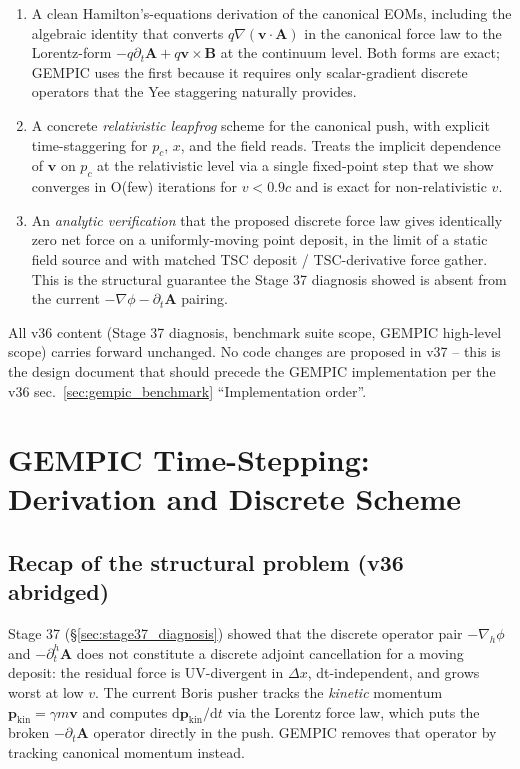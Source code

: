 \documentclass[11pt,a4paper]{article}
\newcommand{\vv}[1]{\mathbf{#1}}
\newcommand{\dd}{\mathrm{d}}
\begin{document}
\begin{enumerate}
  \item A clean Hamilton's-equations derivation of the canonical
    EOMs, including the algebraic identity that converts
    $q\nabla(\vv{v}\cdot\vv{A})$ in the canonical force law to the
    Lorentz-form $-q\partial_t\vv{A} + q\vv{v}\times\vv{B}$ at the
    continuum level.  Both forms are exact; GEMPIC uses the first
    because it requires only scalar-gradient discrete operators
    that the Yee staggering naturally provides.
  \item A concrete \emph{relativistic leapfrog} scheme for the
    canonical push, with explicit time-staggering for $p_c$, $x$,
    and the field reads.  Treats the implicit dependence of
    $\vv{v}$ on $p_c$ at the relativistic level via a single
    fixed-point step that we show converges in O(few) iterations
    for $v < 0.9c$ and is exact for non-relativistic $v$.
  \item An \emph{analytic verification} that the proposed discrete
    force law gives identically zero net force on a uniformly-moving
    point deposit, in the limit of a static field source and with
    matched TSC deposit / TSC-derivative force gather.  This is the
    structural guarantee the Stage 37 diagnosis showed is absent
    from the current $-\nabla\phi - \partial_t\vv{A}$ pairing.
\end{enumerate}

All v36 content (Stage 37 diagnosis, benchmark suite scope, GEMPIC
high-level scope) carries forward unchanged.  No code changes are
proposed in v37 -- this is the design document that should precede
the GEMPIC implementation per the v36
sec.~\ref{sec:gempic_benchmark} ``Implementation order''.

\newpage

\section{GEMPIC Time-Stepping: Derivation and Discrete Scheme}
\label{sec:gempic_derivation}

\subsection{Recap of the structural problem (v36 abridged)}

Stage 37 (\S\ref{sec:stage37_diagnosis}) showed that the discrete
operator pair $-\nabla_h\phi$ and $-\partial^h_t\vv{A}$ does not
constitute a discrete adjoint cancellation for a moving deposit:
the residual force is UV-divergent in $\Delta x$, dt-independent,
and grows worst at low $v$.  The current Boris pusher tracks the
\emph{kinetic} momentum $\vv{p}_{\mathrm{kin}} = \gamma m \vv{v}$
and computes $\dd \vv{p}_{\mathrm{kin}}/\dd t$ via the Lorentz
force law, which puts the broken $-\partial_t\vv{A}$ operator
directly in the push.  GEMPIC removes that operator by tracking
canonical momentum instead.
\end{document}
